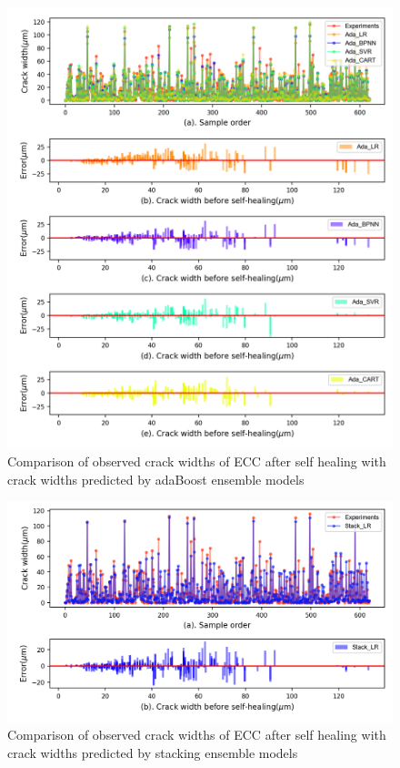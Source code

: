 \documentclass[11pt]{article}
\begin{document}
		\begin{figure}[!h]
		\centering
		\includegraphics[width=\textwidth]{AdaError.png}
		\caption{Comparison of observed crack widths of ECC after self healing with crack widths predicted by adaBoost ensemble models}
		\label{error3}
	\end{figure}

		\begin{figure}[!h]
	\centering
	\includegraphics[width=\textwidth]{StackError.png}
	\caption{Comparison of observed crack widths of ECC after self healing with crack widths predicted by stacking ensemble models}
	\label{error4}
\end{figure}
\end{document}
